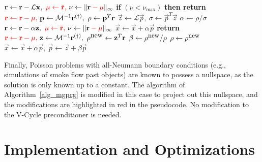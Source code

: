 \begin{algorithm}[h]
\caption{Multigrid-preconditioned conjugate gradient.
 \textit{Red-colored steps in the algorithm are applicable when the Poisson problem has a nullspace (i.e., all
  Neumann boundary conditions), and should be omitted when Dirichlet boundaries are present.}
  \newline $(\dag)$ $\vec{u}\gets\mathcal{M}^{-1}\vec{b}$ is implemented by calling {
 V-Cycle}$(\vec{u},\vec{b})$}
\label{alg_mgpcg}
\begin{algorithmic}[1]
\State $\vec{r}\gets\vec{r}-\mathcal{L}\vec{x},\ {\color{red}\mu\gets\bar{\vec{r}},}\ \nu\gets\|{\vec{r}\color{red}-\mu}\|_{\infty}$
\State \textbf{if} {$(\nu<\nu_{\max})$} \textbf{then return}
\State ${\color{red}\vec{r}\gets\vec{r}-\mu,}\ \vec{p}\gets\mathcal{M}^{-1}\vec{r}^{(\dag)},\ \rho\gets\vec{p}^T\vec{r}$
\State $\vec{z}\gets\mathcal{L}\vec{p},\ \sigma\gets\vec{p}^T\vec{z}$
\State $\alpha\gets\rho/\sigma$
\State $\vec{r}\gets\vec{r}-\alpha\vec{z},\ {\color{red}\mu\gets\bar{\vec{r}},}\ \nu\gets\|{\vec{r}\color{red}-\mu}\|_{\infty}$
\State $\vec{x}\gets\vec{x}+\alpha\vec{p}$
\State \textbf{return}
\EndIf
\State ${\color{red}\vec{r}\gets\vec{r}-\mu,}\ \vec{z}\gets\mathcal{M}^{-1}\vec{r}^{(\dag)},\ \rho^{\mbox{new}}\gets\vec{z}^T\vec{r}$
\State $\beta\gets\rho^{\mbox{\small new}}/\rho$
\State $\rho\gets\rho^{\mbox{\small new}}$
\State $\vec{x}\gets\vec{x}+\alpha\vec{p},\ \vec{p}\gets\vec{z}+\beta\vec{p}$
\EndFor
\EndProcedure
\end{algorithmic}
\end{algorithm}

Finally, Poisson problems with all-Neumann boundary conditions (e.g., simulations of smoke flow past objects) are known to possess a nullspace, as the solution is only known up to a
constant. The algorithm of Algorithm~\ref{alg_mgpcg} is modified in this case to project out this nullspace, and the modifications are highlighted in red in the pseudocode. No modification
to the V-Cycle preconditioner is needed.

\section{Implementation and Optimizations}
\label{sec_implementation}

